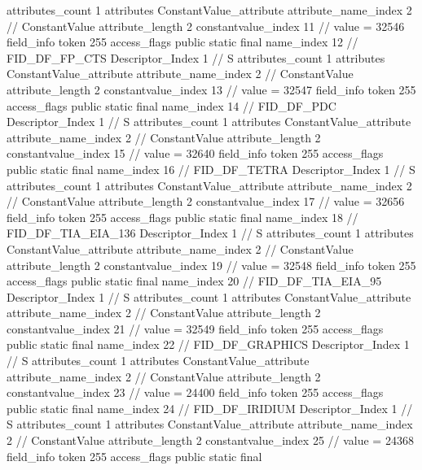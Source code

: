 {{{{{				attributes_count	1
				attributes {
				ConstantValue_attribute {
					attribute_name_index	2		// ConstantValue
					attribute_length	2
					constantvalue_index	11		// value = 32546
				}
				}
			}
			field_info {
				token	255
				access_flags	public static final
				name_index	12		// FID_DF_FP_CTS
				Descriptor_Index	1		// S
				attributes_count	1
				attributes {
				ConstantValue_attribute {
					attribute_name_index	2		// ConstantValue
					attribute_length	2
					constantvalue_index	13		// value = 32547
				}
				}
			}
			field_info {
				token	255
				access_flags	public static final
				name_index	14		// FID_DF_PDC
				Descriptor_Index	1		// S
				attributes_count	1
				attributes {
				ConstantValue_attribute {
					attribute_name_index	2		// ConstantValue
					attribute_length	2
					constantvalue_index	15		// value = 32640
				}
				}
			}
			field_info {
				token	255
				access_flags	public static final
				name_index	16		// FID_DF_TETRA
				Descriptor_Index	1		// S
				attributes_count	1
				attributes {
				ConstantValue_attribute {
					attribute_name_index	2		// ConstantValue
					attribute_length	2
					constantvalue_index	17		// value = 32656
				}
				}
			}
			field_info {
				token	255
				access_flags	public static final
				name_index	18		// FID_DF_TIA_EIA_136
				Descriptor_Index	1		// S
				attributes_count	1
				attributes {
				ConstantValue_attribute {
					attribute_name_index	2		// ConstantValue
					attribute_length	2
					constantvalue_index	19		// value = 32548
				}
				}
			}
			field_info {
				token	255
				access_flags	public static final
				name_index	20		// FID_DF_TIA_EIA_95
				Descriptor_Index	1		// S
				attributes_count	1
				attributes {
				ConstantValue_attribute {
					attribute_name_index	2		// ConstantValue
					attribute_length	2
					constantvalue_index	21		// value = 32549
				}
				}
			}
			field_info {
				token	255
				access_flags	public static final
				name_index	22		// FID_DF_GRAPHICS
				Descriptor_Index	1		// S
				attributes_count	1
				attributes {
				ConstantValue_attribute {
					attribute_name_index	2		// ConstantValue
					attribute_length	2
					constantvalue_index	23		// value = 24400
				}
				}
			}
			field_info {
				token	255
				access_flags	public static final
				name_index	24		// FID_DF_IRIDIUM
				Descriptor_Index	1		// S
				attributes_count	1
				attributes {
				ConstantValue_attribute {
					attribute_name_index	2		// ConstantValue
					attribute_length	2
					constantvalue_index	25		// value = 24368
				}
				}
			}
			field_info {
				token	255
				access_flags	public static final
}}}}}
